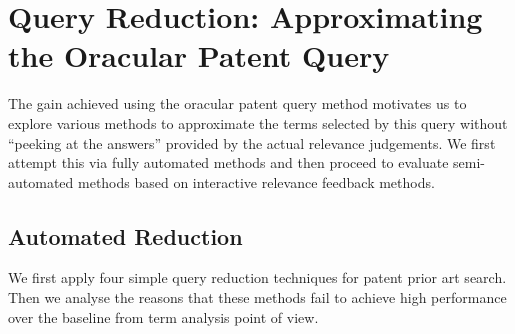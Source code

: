 \section{Query Reduction: Approximating the Oracular Patent Query}
\label{sec: QR}
The gain achieved using the oracular patent query method motivates us to explore various methods to approximate the terms
selected by this query without ``peeking at the answers'' provided by
the actual relevance judgements.  We first attempt this via fully
automated methods and then proceed to evaluate semi-automated methods
based on interactive relevance feedback methods.
\subsection{Automated Reduction}
\label{AutomatedReduction}
We first apply four simple query reduction techniques for patent prior art search. Then we analyse the reasons that these methods fail to achieve high performance over the baseline from term analysis point of view.
